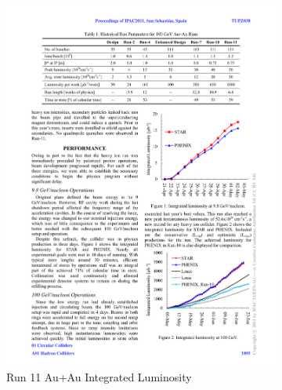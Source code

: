 \begin{figure}[htbp]
    \begin{subfigure}{0.5\textwidth}
        \includegraphics[width=\textwidth]{Plots/NPE/Run11_Lum.pdf}
        \caption{Run 11 Au+Au Integrated Luminosity}
        \label{fig:Luma}
    \end{subfigure}
    \begin{subfigure}{0.5\textwidth}

\end{subfigure}
\end{figure}
